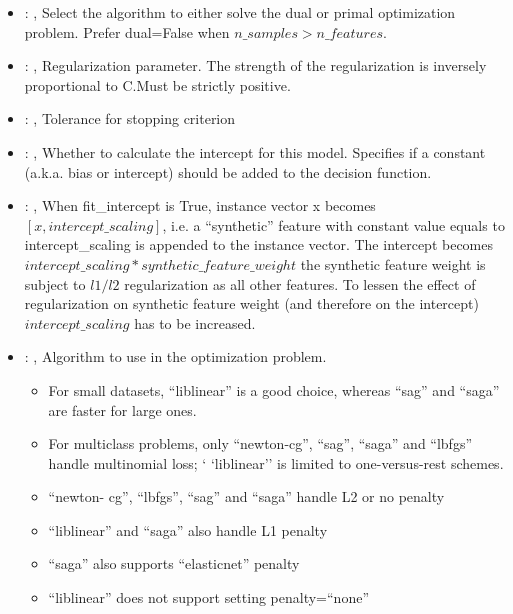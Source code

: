 \begin{itemize}
    \item {}: , 
      Select the algorithm to either solve the dual or primal optimization problem.
      Prefer dual=False when $n\_samples > n\_features$.

    \item {}: , 
      Regularization parameter. The strength of the regularization is inversely
      proportional to C.Must be strictly positive.

    \item {}: , 
      Tolerance for stopping criterion

    \item {}: , 
      Whether to calculate the intercept for this model. Specifies if a constant (a.k.a. bias or
      intercept) should be added to the decision function.

    \item {}: , 
      When fit\_intercept is True, instance vector x becomes $[x, intercept\_scaling]$,
      i.e. a “synthetic” feature with constant value equals to intercept\_scaling is appended
      to the instance vector. The intercept becomes $intercept\_scaling * synthetic\_feature\_weight$
      \nb the synthetic feature weight is subject to $l1/l2$ regularization as all other features.
      To lessen the effect of regularization on synthetic feature weight (and therefore on the
      intercept)                                                  $intercept\_scaling$ has to be
      increased.

    \item {}: , 
      Algorithm to use in the optimization problem.
      \begin{itemize}                                                    \item For small datasets,
      ``liblinear'' is a good choice, whereas ``sag'' and ``saga'' are faster for large ones.
      \item For multiclass problems, only ``newton-cg'', ``sag'', ``saga'' and ``lbfgs'' handle
      multinomial loss; `                                                    `liblinear'' is limited
      to one-versus-rest schemes.                                                    \item ``newton-
      cg'', ``lbfgs'', ``sag'' and ``saga'' handle L2 or no penalty
      \item ``liblinear'' and ``saga'' also handle L1 penalty
      \item ``saga'' also supports ``elasticnet'' penalty
      \item ``liblinear'' does not support setting penalty=``none''
      \end{itemize}


\end{itemize}
